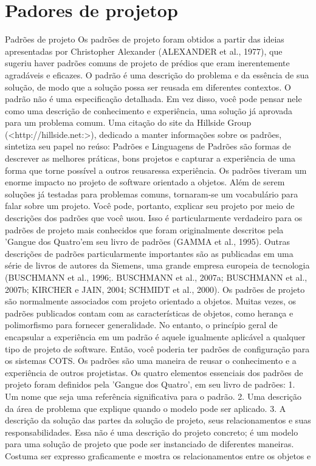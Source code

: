 \section{Padores de projetop}

Padrões de projeto
Os padrões de projeto foram obtidos a partir das ideias apresentadas por Christopher Alexander (ALEXANDER
et al., 1977), que sugeriu haver padrões comuns de projeto de prédios que eram inerentemente agradáveis e
eficazes. O padrão é uma descrição do problema e da essência de sua solução, de modo que a solução possa ser
reusada em diferentes contextos. O padrão não é uma especificação detalhada. Em vez disso, você pode pensar
nele como uma descrição de conhecimento e experiência, uma solução já aprovada para um problema comum.
Uma citação do site da Hillside Group (<http://hillside.net:>), dedicado a manter informações sobre os padrões,
sintetiza seu papel no reúso:
Padrões e Linguagens de Padrões são formas de descrever as melhores práticas, bons projetos e capturar a experiência
de uma forma que torne possível a outros reusaressa experiência.
Os padrões tiveram um enorme impacto no projeto de software orientado a objetos. Além de serem soluções
já testadas para problemas comuns, tornaram-se um vocabulário para falar sobre um projeto. Você pode, portanto,
explicar seu projeto por meio de descrições dos padrões que você usou. Isso é particularmente verdadeiro para os
padrões de projeto mais conhecidos que foram originalmente descritos pela 'Gangue dos Quatro'em seu livro de
padrões (GAMMA et al., 1995). Outras descrições de padrões particularmente importantes são as publicadas em
uma série de livros de autores da Siemens, uma grande empresa europeia de tecnologia (BUSCHMANN et al., 1996;.
BUSCHMANN et al., 2007a; BUSCHMANN et al., 2007b; KIRCHER e JAIN, 2004; SCHMIDT et al., 2000).
Os padrões de projeto são normalmente associados com projeto orientado a objetos. Muitas vezes, os padrões
publicados contam com as características de objetos, como herança e polimorfismo para fornecer generalidade.
No entanto, o princípio geral de encapsular a experiência em um padrão é aquele igualmente aplicável a qualquer
tipo de projeto de software. Então, você poderia ter padrões de configuração para os sistemas COTS. Os padrões
são uma maneira de reusar o conhecimento e a experiência de outros projetistas.
Os quatro elementos essenciais dos padrões de projeto foram definidos pela 'Gangue dos Quatro', em seu livro
de padrões:
1. Um nome que seja uma referência significativa para o padrão.
2. Uma descrição da área de problema que explique quando o modelo pode ser aplicado.
3. A descrição da solução das partes da solução de projeto, seus relacionamentos e suas responsabilidades. Essa
não é uma descrição do projeto concreto; é um modelo para uma solução de projeto que pode ser instanciado
de diferentes maneiras. Costuma ser expresso graficamente e mostra os relacionamentos entre os objetos e

